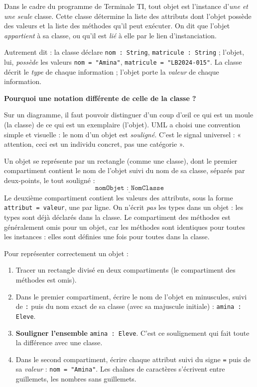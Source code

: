 \documentclass[11pt]{article}
\newcommand{\cle}[1]{{\popxbold\color{popdark}#1}}
\newcounter{popsec}
\newcounter{popsub}
\newcommand{\courssub}[1]{%
  \stepcounter{popsub}%
  \par\vspace{9pt}\noindent{\popxbold\fontsize{11.5}{13}\selectfont\color{popink}{\color{poporange}\thepopsec.\thepopsub}\hspace{6pt}#1}\par\nopagebreak\vspace{4pt}
}
\begin{document}
\begin{propriete}
Dans le cadre du programme de Terminale TI, tout objet est l'instance d'\emph{une et une seule} classe. Cette classe détermine la liste des attributs dont l'objet possède des valeurs et la liste des méthodes qu'il peut exécuter. On dit que l'objet \emph{appartient} à sa classe, ou qu'il est \emph{lié} à elle par le lien d'\cle{instanciation}.
\end{propriete}

Autrement dit : la classe déclare \texttt{nom : String}, \texttt{matricule : String} ; l'objet, lui, \emph{possède} les valeurs \texttt{nom = "Amina"}, \texttt{matricule = "LB2024-015"}. La classe décrit le \emph{type} de chaque information ; l'objet porte la \emph{valeur} de chaque information.

\courssub{Notation UML d'un objet}

\textbf{Pourquoi une notation différente de celle de la classe ?}\par
Sur un diagramme, il faut pouvoir distinguer d'un coup d'œil ce qui est un moule (la classe) de ce qui est un exemplaire (l'objet). UML a choisi une convention simple et visuelle : le nom d'un objet est \emph{souligné}. C'est le signal universel : « attention, ceci est un individu concret, pas une catégorie ».

\begin{propriete}
Un objet se représente par un \cle{rectangle} (comme une classe), dont le premier compartiment contient le nom de l'objet suivi du nom de sa classe, séparés par deux-points, le tout \cle{souligné} :
\[ \underline{\texttt{nomObjet : NomClasse}} \]
Le deuxième compartiment contient les \cle{valeurs} des attributs, sous la forme \texttt{attribut = valeur}, une par ligne. On n'écrit \emph{pas} les types dans un objet : les types sont déjà déclarés dans la classe. Le compartiment des méthodes est généralement omis pour un objet, car les méthodes sont identiques pour toutes les instances : elles sont définies une fois pour toutes dans la classe.
\end{propriete}

\begin{methode}
Pour représenter correctement un objet :
\begin{enumerate}
\item Tracer un rectangle divisé en deux compartiments (le compartiment des méthodes est omis).
\item Dans le premier compartiment, écrire le nom de l'objet en minuscules, suivi de \texttt{:} puis du nom exact de sa classe (avec sa majuscule initiale) : \texttt{amina : Eleve}.
\item \textbf{Souligner l'ensemble} \texttt{amina : Eleve}. C'est ce soulignement qui fait toute la différence avec une classe.
\item Dans le second compartiment, écrire chaque attribut suivi du signe \texttt{=} puis de sa \emph{valeur} : \texttt{nom = "Amina"}. Les chaînes de caractères s'écrivent entre guillemets, les nombres sans guillemets.
\end{enumerate}
\end{methode}
\end{document}
